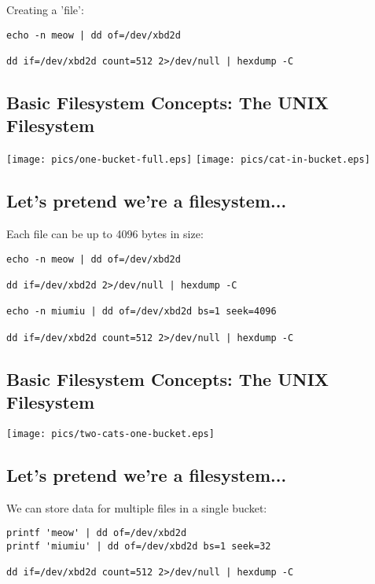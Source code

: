 \documentclass[xga]{xdvislides}
\begin{document}
Creating a 'file':
\begin{verbatim}
echo -n meow | dd of=/dev/xbd2d

dd if=/dev/xbd2d count=512 2>/dev/null | hexdump -C
\end{verbatim}

\subsection{Basic Filesystem Concepts: The UNIX Filesystem}
\vspace*{\fill}
\begin{center}
\texttt{[image: pics/one-bucket-full.eps]}
\hspace*{5mm}
\texttt{[image: pics/cat-in-bucket.eps]}
\end{center}
\vspace*{\fill}

\subsection{Let's pretend we're a filesystem...}

Each file can be up to 4096 bytes in size:
\begin{verbatim}
echo -n meow | dd of=/dev/xbd2d

dd if=/dev/xbd2d 2>/dev/null | hexdump -C

echo -n miumiu | dd of=/dev/xbd2d bs=1 seek=4096

dd if=/dev/xbd2d count=512 2>/dev/null | hexdump -C
\end{verbatim}

\subsection{Basic Filesystem Concepts: The UNIX Filesystem}
\vspace*{\fill}
\begin{center}
\texttt{[image: pics/two-cats-one-bucket.eps]} \\
\end{center}
\vspace*{\fill}

\subsection{Let's pretend we're a filesystem...}

We can store data for multiple files in a single
bucket:
\begin{verbatim}
printf 'meow' | dd of=/dev/xbd2d
printf 'miumiu' | dd of=/dev/xbd2d bs=1 seek=32

dd if=/dev/xbd2d count=512 2>/dev/null | hexdump -C
\end{verbatim}
\end{document}
